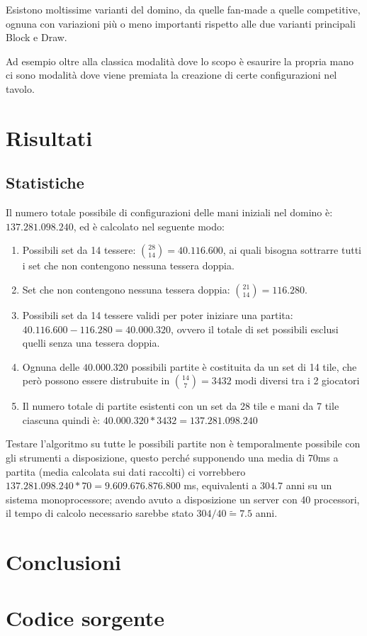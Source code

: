 \documentclass[a4paper.12pt]{report} %
\begin{document}
Esistono moltissime varianti del domino, da quelle fan-made a quelle competitive, ognuna con variazioni più o meno importanti rispetto alle due varianti principali Block e Draw.

Ad esempio oltre alla classica modalità dove lo scopo è esaurire la propria mano ci sono modalità dove viene premiata la creazione di certe configurazioni nel tavolo.


\chapter{Risultati}

\section{Statistiche}

Il numero totale possibile di configurazioni delle mani iniziali nel domino è: \(137.281.098.240\), ed è calcolato nel seguente modo:


\begin{enumerate}
    \item Possibili set da 14 tessere: \(\binom{28}{14} = 40.116.600\), ai quali bisogna sottrarre tutti i set che non contengono nessuna tessera doppia.
    \item Set che non contengono nessuna tessera doppia: \(\binom{21}{14} = 116.280\).
    \item Possibili set da 14 tessere validi per poter iniziare una partita: \(40.116.600 - 116.280 = 40.000.320\), ovvero il totale di set possibili esclusi quelli senza una tessera doppia.
    \item Ognuna delle \(40.000.320\) possibili partite è costituita da un set di 14 tile, che però possono essere distrubuite in \(\binom{14}{7} = 3432\) modi diversi tra i 2 giocatori
    \item Il numero totale di partite esistenti con un set da 28 tile e mani da 7 tile ciascuna quindi è: \(40.000.320 * 3432 = 137.281.098.240\)
\end{enumerate}

Testare l'algoritmo su tutte le possibili partite non è temporalmente possibile con gli strumenti a disposizione, questo perché supponendo una media di 70ms a partita (media calcolata sui dati raccolti) ci vorrebbero \(137.281.098.240 * 70  = 9.609.676.876.800\) ms, equivalenti a \(304.7\) anni su un sistema monoprocessore; avendo avuto a disposizione un server con 40 processori, il tempo di calcolo necessario sarebbe stato \(304 / 40 \tilde= 7.5\) anni. 



\chapter{Conclusioni}

\appendix
\chapter{Codice sorgente}

\end{document}

